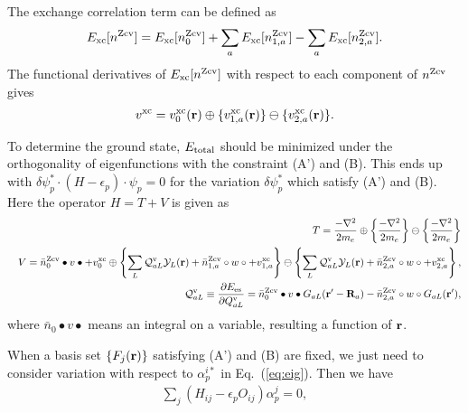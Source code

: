 \documentclass[twocolumn,showpacs,preprintnumbers,amsmath,amssymb,floatfix]{revtex4-1}
\newcommand{\bfr}{{\bf r}}
\newcommand{\bfR}{{\bf R}}
\newcommand{\YY}{{\cal Y}}
\newcommand{\ooplus}{\oplus}
\newcommand{\oominus}{\ominus}
\newcommand{\req}[1]{\mbox{Eq.~\!(\ref{#1})}}
\def\EMAXm{ E^{\rm rmesh}_{\rm MAX} }
\def\EMAXm{ E^{\rm rmesh}_{\rm MAX} }
\def\nzcv{n^{\rm Zcv}}
\def\barnzcv{\bar{n}^{\rm Zcv}}
\def\RR{w}
\begin{document}
\begin{widetext}
The exchange correlation term can be defined as
\begin{eqnarray}
E_{\rm xc}[\nzcv] = E_{\rm xc}[\nzcv_0] 
+  \sum_a E_{\rm xc}[\nzcv_{1,a}]  
-  \sum_a E_{\rm xc}[\nzcv_{2,a}].
\label{eq:exc}
\end{eqnarray}
The functional derivatives of $E_{\rm xc}[\nzcv]$
with respect to each component of $\nzcv$ gives
\begin{eqnarray}
v^{\rm xc} = v^{\rm xc}_0(\bfr)
\ooplus  \{v^{\rm xc}_{1,a}(\bfr)  \}
\oominus \{v^{\rm xc}_{2,a}(\bfr)  \}.
\label{eq:vxc}
\end{eqnarray}

To determine the ground state, 
$E_{\rm total}$ should be minimized under the orthogonality of eigenfunctions with
the constraint (A') and (B).
This ends up with 
$\delta \psi^*_p \cdot (H - \epsilon_p) \cdot \psi_p =0$ for
the variation $\delta \psi^*_p$ which satisfy (A') and (B). 
Here the operator $H=T+V$ is given as
\begin{eqnarray}
&&T=\frac{-\nabla^2 }{2m_e} \oplus \left\{\frac{-\nabla^2 }{2m_e}\right\} 
\ominus \left\{\frac{-\nabla^2 }{2m_e}\right\} \\
&&V= 
\barnzcv_0 \bullet v \bullet + v^{\rm xc}_0
\ooplus
\left\{ \sum_L
{\cal Q}^{\rm v}_{aL} \YY_L(\bfr)
+ \barnzcv_{1,a} \circ \RR \circ + v^{\rm xc}_{1,a} 
\right\} 
\oominus
\left\{ \sum_L
{\cal Q}^{\rm v}_{aL} \YY_L(\bfr)
+ \barnzcv_{2,a} \circ \RR \circ + v^{\rm xc}_{2,a} 
\right\}, \label{eq:v} \\
&&{\cal Q}^{\rm v}_{aL}\equiv \frac{\partial E_{\rm es}}{\partial {Q}^{\rm v}_{aL}} =
\barnzcv_0 \bullet v \bullet G_{aL}(\bfr'-\bfR_a)
-\barnzcv_{2,a} \circ \RR \circ G_{aL}(\bfr'), \label{eq:calqdef}
\end{eqnarray}
where $\bar{n}_0 \bullet v \bullet$ means an integral on a variable, resulting a function of $\bfr$.

When a basis set $\{F_j(\bfr)\}$ satisfying (A') and (B) are fixed, we
just need to consider variation with respect to $\alpha_{p}^{i*}$ in
\req{eq:eig}. Then we have
\begin{eqnarray}
\sum_j (H_{ij} -\epsilon_p O_{ij}) \alpha_p^j =0,
\label{eq:eigenp}
\end{eqnarray}
\end{widetext}
\end{document}
